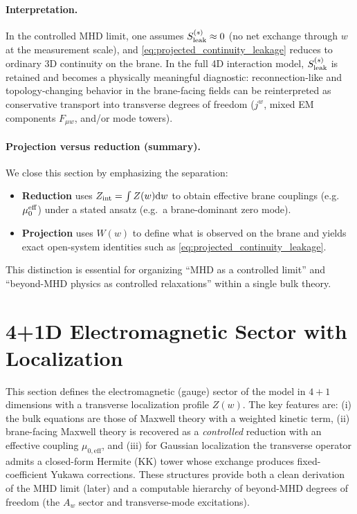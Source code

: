 \documentclass[11pt]{article}
\newcommand{\Z}{Z}              %
\newcommand{\W}{W}              %
\newcommand{\Sleak}{S_{\rm leak}}
\newcommand{\Zint}{Z_{\rm int}}
\begin{document}
\paragraph{Interpretation.}
In the controlled MHD limit, one assumes \(\Sleak^{(s)}\approx 0\) (no net exchange
through \(w\) at the measurement scale), and \eqref{eq:projected_continuity_leakage}
reduces to ordinary 3D continuity on the brane. In the full 4D interaction model,
\(\Sleak^{(s)}\) is retained and becomes a physically meaningful diagnostic:
reconnection-like and topology-changing behavior in the brane-facing fields can
be reinterpreted as conservative transport into transverse degrees of freedom
(\(j^w\), mixed EM components \(F_{\mu w}\), and/or mode towers).

\paragraph{Projection versus reduction (summary).}
We close this section by emphasizing the separation:
\begin{itemize}[leftmargin=1.7em]
\item \textbf{Reduction} uses \(\Zint=\int \Z(w)\dd w\) to obtain effective brane
couplings (e.g.\ \(\mu_0^{\rm eff}\)) under a stated ansatz (e.g.\ a brane-dominant
zero mode).
\item \textbf{Projection} uses \(\W(w)\) to define what is observed on the brane
and yields exact open-system identities such as \eqref{eq:projected_continuity_leakage}.
\end{itemize}
This distinction is essential for organizing ``MHD as a controlled limit'' and
``beyond-MHD physics as controlled relaxations'' within a single bulk theory.

\section{4+1D Electromagnetic Sector with Localization}
\label{sec:em_sector}

This section defines the electromagnetic (gauge) sector of the model in \(4+1\)
dimensions with a transverse localization profile \(\Z(w)\). The key features are:
(i) the bulk equations are those of Maxwell theory with a weighted kinetic term,
(ii) brane-facing Maxwell theory is recovered as a \emph{controlled} reduction with
an effective coupling \(\mu_{0,\mathrm{eff}}\), and (iii) for Gaussian localization
the transverse operator admits a closed-form Hermite (KK) tower whose exchange
produces fixed-coefficient Yukawa corrections. These structures provide both a
clean derivation of the MHD limit (later) and a computable hierarchy of beyond-MHD
degrees of freedom (the \(A_w\) sector and transverse-mode excitations).
\end{document}
